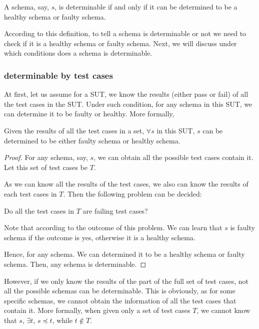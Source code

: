 \begin{definition}\label{de:deteminable}
A schema, say, $s$, is determinable if and only if it can be determined to be a healthy schema or faulty schema.
\end{definition}

According to this definition, to tell a schema is determinable or not we need to check if it is a healthy schema or faulty schema.  Next, we will discuss under which conditions does a schema is determinable.


\subsubsection{determinable by test cases}

At first, let us assume for a SUT, we know the results (either pass or fail) of all the test cases in the SUT. Under such condition, for any schema in this SUT, we can determine it to be faulty or healthy.  More formally,

\begin{proposition}\label{pro:determinablefull}
Given the results of all the test cases in a set, $\forall s$ in this SUT,  $s$ can be determined to be either faulty schema or healthy schema.
\end{proposition}

\begin{proof}
For any schema, say, $s$, we can obtain all the possible test cases contain it. Let this set of test cases be $T$.

As we can know all the results of the test cases, we also can know the results of each test cases in $T$. Then the following problem can be decided:

Do all the test cases in $T$ are failing test cases?

Note that according to the outcome of this problem. We can learn that $s$ is faulty schema if the outcome is yes, otherwise it is a healthy schema.

Hence, for any schema. We can determined it to be a healthy schema or faulty schema. Then, any schema is determinable.
\end{proof}

However, if we only know the results of the part of the full set of test cases, not all the possible schemas can be determinable. This is obviously, as for some specific schemas, we cannot obtain the information of all the test cases that contain it.  More formally, when given only a set of test cases $T$, we cannot know that $s$, $\exists  t$, $s \preceq t$, while $t \notin T$.


